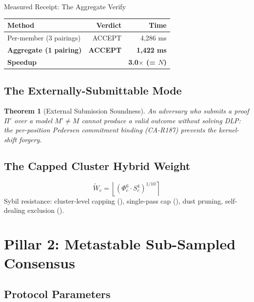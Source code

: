 \documentclass[11pt, a4paper]{article}
\newtheorem{theorem}{Theorem}
\begin{document}
\begin{receiptbox}{Measured Receipt: The Aggregate Verify}
\centering
\begin{tabular}{lrr}
\toprule
\textbf{Method} & \textbf{Verdict} & \textbf{Time} \\
\midrule
Per-member (3 pairings) & ACCEPT & 4{,}286 ms \\
\textbf{Aggregate (1 pairing)} & \textbf{ACCEPT} & \textbf{1{,}422 ms} \\
\midrule
\textcolor{hsmaGreen}{\textbf{Speedup}} & & \textcolor{hsmaGreen}{\textbf{3.0$\times$ (= $N$)}} \\
\bottomrule
\end{tabular}
\end{receiptbox}

\subsection{The Externally-Submittable Mode}

\begin{theorem}[External Submission Soundness]
\label{thm:ext-sub}
An adversary who submits a proof $\Pi'$ over a model $M' \neq M$ cannot produce a valid outcome without solving DLP: the per-position
Pedersen commitment binding (CA-R187) prevents the kernel-shift forgery.
\end{theorem}

\subsection{The Capped Cluster Hybrid Weight}

\begin{equation}
\tilde{W}_c = \left\lfloor (\Phi_c^6 \cdot S_c^4)^{1/10} \right\rceil
\end{equation}
Sybil resistance: cluster-level capping (), single-pass cap
(), dust pruning, self-dealing exclusion ().

\section{Pillar 2: Metastable Sub-Sampled Consensus}
\label{sec:mssc}

\subsection{Protocol Parameters}
\end{document}
